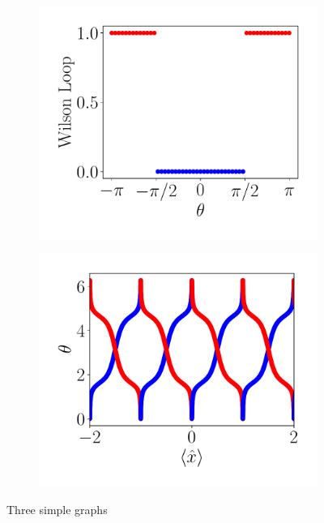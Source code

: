 \begin{figure}[h!]
\begin{subfigure}[b!]{0.27 \textwidth}
     \end{subfigure}\hspace*{-0.9em}
     \begin{subfigure}[b!]{0.27 \textwidth}
         \caption{}
         \includegraphics[width=\textwidth]{Imagenes/Shh_images/winding_shh_pump.pdf}
     \end{subfigure}\hspace*{-0.9em}
     \begin{subfigure}[b!]{0.27 \textwidth}
         \caption{}
         \includegraphics[width=\textwidth]{Imagenes/Shh_images/wannier_center_shh_pump.pdf}
     \end{subfigure}
        \caption{Three simple graphs}
        \label{fig:Pump_example_Results}
\end{figure}


